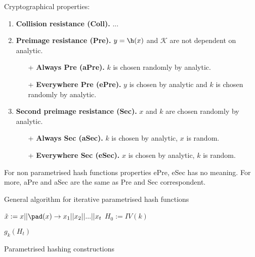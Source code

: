 Cryptographical properties:
\begin{enumerate}
    \item \textbf{Collision resistance (Coll).} ...
    \item \textbf{Preimage resistance (Pre).} $y = \h(x)$ and $\mathcal{K}$ are not
        dependent on analytic.
        \begin{itemize}
            \item[+] \textbf{Always Pre (aPre).} $k$ is chosen randomly by analytic.
            \item[+] \textbf{Everywhere Pre (ePre).} $y$ is chosen by analytic and $k$
                is chosen randomly by analytic.
        \end{itemize}
    \item \textbf{Second preimage resistance (Sec).} $x$ and $k$ are chosen randomly
        by analytic.
        \begin{itemize}
            \item[+] \textbf{Always Sec (aSec).} $k$ is chosen by analytic, $x$ is random.
            \item[+] \textbf{Everywhere Sec (eSec).} $x$ is chosen by analytic, $k$ is random.
        \end{itemize}
\end{enumerate}

\begin{remark}
    For non parametrised hash functions properties ePre, eSec has no meaning.
    For more, aPre and aSec are the same as Pre and Sec correspondent.
\end{remark}

\begin{algorithm2e}[ht]
    \caption{General algorithm for iterative parametrised hash functions}
    

    $\Tilde{x} := x || \pad(x) \rightarrow x_1 || x_2 || ... || x_t$\;
    $H_0 := IV(k)$\;
    
    \Return $g_k(H_t)$\;
\end{algorithm2e}

Parametrised hashing constructions

